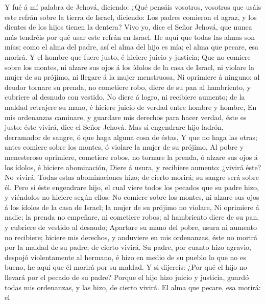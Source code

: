 Y fué á mí palabra de Jehová, diciendo: 
¿Qué pensáis vosotros, vosotros que usáis este refrán sobre la tierra de
Israel, diciendo: Los padres comieron el agraz, y los dientes de los
hijos tienen la dentera?  Vivo yo, dice el Señor Jehová,
que nunca más tendréis por qué usar este refrán en Israel.
 He aquí que todas las almas son mías; como el alma del
padre, así el alma del hijo es mía; el alma que pecare, esa morirá.
 Y el hombre que fuere justo, é hiciere juicio y justicia;
 Que no comiere sobre los montes, ni alzare sus ojos á los
ídolos de la casa de Israel, ni violare la mujer de su prójimo, ni
llegare á la mujer menstruosa,  Ni oprimiere á ninguno; al
deudor tornare su prenda, no cometiere robo, diere de su pan al
hambriento, y cubriere al desnudo con vestido,  No diere á
logro, ni recibiere aumento; de la maldad retrajere su mano, é hiciere
juicio de verdad entre hombre y hombre,  En mis ordenanzas
caminare, y guardare mis derechos para hacer verdad, éste es justo: éste
vivirá, dice el Señor Jehová.  Mas si engendrare hijo
ladrón, derramador de sangre, ó que haga alguna cosa de éstas,
 Y que no haga las otras; antes comiere sobre los montes,
ó violare la mujer de su prójimo,  Al pobre y menesteroso
oprimiere, cometiere robos, no tornare la prenda, ó alzare sus ojos á
los ídolos, é hiciere abominación,  Diere á usura, y
recibiere aumento: ¿vivirá éste? No vivirá. Todas estas abominaciones
hizo; de cierto morirá; su sangre será sobre él.  Pero si
éste engendrare hijo, el cual viere todos los pecados que su padre hizo,
y viéndolos no hiciere según ellos:  No comiere sobre los
montes, ni alzare sus ojos á los ídolos de la casa de Israel; la mujer
de su prójimo no violare,  Ni oprimiere á nadie; la
prenda no empeñare, ni cometiere robos; al hambriento diere de su pan, y
cubriere de vestido al desnudo;  Apartare su mano del
pobre, usura ni aumento no recibiere; hiciere mis derechos, y anduviere
en mis ordenanzas, éste no morirá por la maldad de su padre; de cierto
vivirá.  Su padre, por cuanto hizo agravio, despojó
violentamente al hermano, é hizo en medio de su pueblo lo que no es
bueno, he aquí que él morirá por su maldad.  Y si
dijereis: ¿Por qué el hijo no llevará por el pecado de su padre? Porque
el hijo hizo juicio y justicia, guardó todas mis ordenanzas, y las hizo,
de cierto vivirá.  El alma que pecare, esa morirá: el
